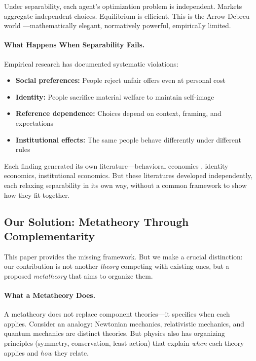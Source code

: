 \documentclass[12pt,a4paper]{article}
\begin{document}
Under separability, each agent's optimization problem is independent. Markets aggregate independent choices. Equilibrium is efficient. This is the Arrow-Debreu world \citep{arrowdeb}---mathematically elegant, normatively powerful, empirically limited.

\paragraph{What Happens When Separability Fails.}
Empirical research has documented systematic violations:
\begin{itemize}
  \item \textbf{Social preferences:} People reject unfair offers even at personal cost \citep{guth1982,fehrschmidt}
  \item \textbf{Identity:} People sacrifice material welfare to maintain self-image \citep{akerlofkranton,benaboutirole}
  \item \textbf{Reference dependence:} Choices depend on context, framing, and expectations \citep{kahnemantversky1979}
  \item \textbf{Institutional effects:} The same people behave differently under different rules \citep{PAP-north1990institutions,acemoglu}
\end{itemize}

Each finding generated its own literature---behavioral economics \citep{camloewrabin}, identity economics, institutional economics. But these literatures developed independently, each relaxing separability in its own way, without a common framework to show how they fit together.

\subsection{Our Solution: Metatheory Through Complementarity}

This paper provides the missing framework. But we make a crucial distinction: our contribution is not another \emph{theory} competing with existing ones, but a proposed \emph{metatheory} that aims to organize them.

\paragraph{What a Metatheory Does.}
A metatheory does not replace component theories---it specifies when each applies. Consider an analogy: Newtonian mechanics, relativistic mechanics, and quantum mechanics are distinct theories. But physics also has organizing principles (symmetry, conservation, least action) that explain \emph{when} each theory applies and \emph{how} they relate.
\end{document}
